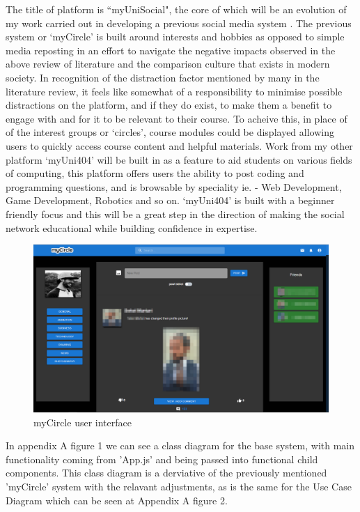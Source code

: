 \documentclass[lettersize,journal]{IEEEtran}
\begin{document}
	The title of platform is ``myUniSocial", the core of which will be an evolution of my work carried out in developing a previous social media system \cite{Daley 2022}.
	The previous system or `myCircle'\cite{myCircle} is built around interests and hobbies as opposed to simple media reposting in an
	effort to navigate the negative impacts observed in the above review of literature and the comparison culture that exists in modern
	society. In recognition of the distraction factor mentioned by many in the literature review, it feels like somewhat of a responsibility
	to minimise possible distractions on the platform, and if they do exist, to make them a benefit to engage with and for it to be relevant
	to their course. To acheive this, in place of of the interest groups or `circles', course modules could be displayed allowing users to
	quickly access course content and helpful materials. Work from my other
    platform `myUni404' \cite{myUni404} will be built in as a feature to aid students
	on various fields of computing, this platform offers users the ability to post coding and programming questions, and is browsable by speciality
	ie. -  Web Development, Game Development, Robotics and so on. `myUni404' is built with a beginner friendly focus and this will be a great
	step in the direction of making the social network educational while building confidence in expertise.


	\begin{figure}[h!]
		\includegraphics[width=\linewidth]{myCircle.PNG}
		\caption{myCircle user interface}
		\label{figure 1}
	\end{figure}


	In appendix A figure 1 we can see a class diagram for the base system, with main functionality coming from 'App.js' and being passed into
	functional child components. This class diagram is a derviative of the previously mentioned 'myCircle' system with the relavant adjustments,
	as is the same for the Use Case Diagram which can be seen at Appendix A figure 2.
\end{document}
